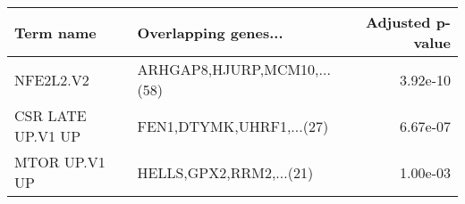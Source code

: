 \begin{tabular}{llr}
\toprule
        Term name &        Overlapping genes... &  Adjusted p-value \\
\midrule
        NFE2L2.V2 & ARHGAP8,HJURP,MCM10,...(58) &          3.92e-10 \\
CSR LATE UP.V1 UP &    FEN1,DTYMK,UHRF1,...(27) &          6.67e-07 \\
    MTOR UP.V1 UP &     HELLS,GPX2,RRM2,...(21) &          1.00e-03 \\
\bottomrule
\end{tabular}
